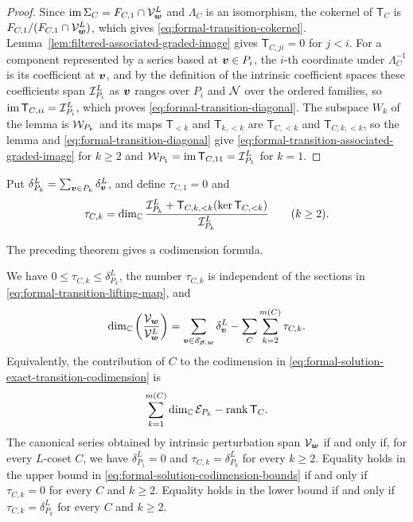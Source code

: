 \begin{proof}
	Since \(\operatorname{im}\Sigma_C=F_{C,1}\cap\mathcal V_{\boldsymbol{w}}^{L}\) and \(\Lambda_C\) is an isomorphism, the cokernel of \(\mathsf T_C\) is \(F_{C,1}/(F_{C,1}\cap\mathcal V_{\boldsymbol{w}}^{L})\), which gives \eqref{eq:formal-transition-cokernel}.
	Lemma~\ref{lem:filtered-associated-graded-image} gives \(\mathsf T_{C,ji}=0\) for \(j<i\).
	For a component represented by a series based at \(\boldsymbol{v}\in P_i\), the \(i\)-th coordinate under \(\Lambda_C^{-1}\) is its coefficient at \(\boldsymbol{v}\), and by the definition of the intrinsic coefficient spaces these coefficients span \(\mathcal I_{P_i}^{L}\) as \(\boldsymbol{v}\) ranges over \(P_i\) and \(\mathcal N\) over the ordered families, so \(\operatorname{im}\mathsf T_{C,ii} = \mathcal I_{P_i}^{L}\), which proves \eqref{eq:formal-transition-diagonal}.
	The subspace \(W_k\) of the lemma is \(\mathcal W_{P_k}\) and its maps \(\mathsf T_{<k}\) and \(\mathsf T_{k,<k}\) are \(\mathsf T_{C,<k}\) and \(\mathsf T_{C,k,<k}\), so the lemma and \eqref{eq:formal-transition-diagonal} give \eqref{eq:formal-transition-associated-graded-image} for \(k\geq2\) and \(\mathcal W_{P_1}=\operatorname{im}\mathsf T_{C,11}=\mathcal I_{P_1}^{L}\) for \(k=1\).
\end{proof}

Put \(\delta_{P_k}^{L} = \sum_{\boldsymbol{v}\in P_k}\delta_{\boldsymbol{v}}^{L}\), and define \(\tau_{C,1}=0\) and
\begin{equation}
	\tau_{C,k}
	=
	\dim_{\mathbb C}
	\frac{
		\mathcal I_{P_k}^{L}
		+
		\mathsf T_{C,k,<k}(\ker\mathsf T_{C,<k})}
	{\mathcal I_{P_k}^{L}}
	\qquad(k\geq2).
	\label{eq:formal-transition-correction}
\end{equation}

The preceding theorem gives a codimension formula.

\begin{corollary}
	\label{cor:formal-solution-exact-codimension}
	We have \(0\leq\tau_{C,k}\leq\delta_{P_k}^{L}\), the number \(\tau_{C,k}\) is independent of the sections in \eqref{eq:formal-transition-lifting-map}, and
	\begin{equation}
		\dim_{\mathbb C}
		\left(
		\frac{\mathcal V_{\boldsymbol{w}}}
		{\mathcal V_{\boldsymbol{w}}^{L}}
		\right)
		=
		\sum_{\boldsymbol{v}\in\mathscr E_{\boldsymbol{\beta},\boldsymbol{w}}}
		\delta_{\boldsymbol{v}}^{L}
		-
		\sum_C\sum_{k=2}^{m(C)}\tau_{C,k}.
		\label{eq:formal-solution-exact-transition-codimension}
	\end{equation}
	Equivalently, the contribution of \(C\) to the codimension in \eqref{eq:formal-solution-exact-transition-codimension} is
	\begin{equation}
		\sum_{k=1}^{m(C)}\dim_{\mathbb C}\mathcal E_{P_k}
		-
		\operatorname{rank}\mathsf T_C.
		\label{eq:formal-solution-cokernel-rank}
	\end{equation}
	The canonical series obtained by intrinsic perturbation span \(\mathcal V_{\boldsymbol{w}}\) if and only if, for every \(L\)-coset \(C\), we have \(\delta_{P_1}^{L}=0\) and \(\tau_{C,k}=\delta_{P_k}^{L}\) for every \(k\geq2\).
	Equality holds in the upper bound in \eqref{eq:formal-solution-codimension-bounds} if and only if \(\tau_{C,k}=0\) for every \(C\) and \(k\geq2\).
	Equality holds in the lower bound if and only if \(\tau_{C,k}=\delta_{P_k}^{L}\) for every \(C\) and \(k\geq2\).
\end{corollary}

